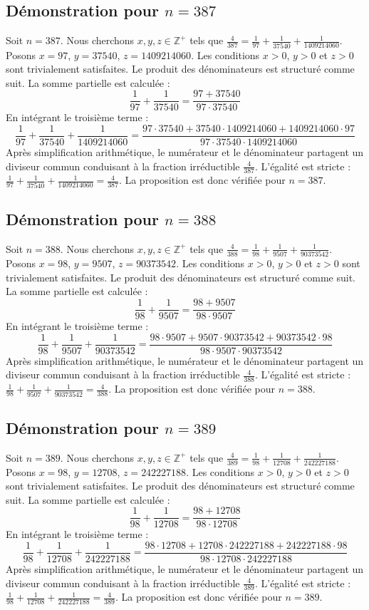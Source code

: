 \documentclass[11pt,a4paper]{article}
\begin{document}
\subsection{Démonstration pour $n = 387$}
Soit $n = 387$. Nous cherchons $x, y, z \in \mathbb{Z}^{+}$ tels que $\frac{4}{387} = \frac{1}{97} + \frac{1}{37540} + \frac{1}{1409214060}$.
Posons $x = 97$, $y = 37540$, $z = 1409214060$.
Les conditions $x > 0$, $y > 0$ et $z > 0$ sont trivialement satisfaites.
Le produit des dénominateurs est structuré comme suit. La somme partielle est calculée :
$$ \frac{1}{97} + \frac{1}{37540} = \frac{97+37540}{97 \cdot 37540} $$
En intégrant le troisième terme :
$$ \frac{1}{97} + \frac{1}{37540} + \frac{1}{1409214060} = \frac{97 \cdot 37540 + 37540 \cdot 1409214060 + 1409214060 \cdot 97}{97 \cdot 37540 \cdot 1409214060} $$
Après simplification arithmétique, le numérateur et le dénominateur partagent un diviseur commun conduisant à la fraction irréductible $\frac{4}{387}$.
L'égalité est stricte : $\frac{1}{97} + \frac{1}{37540} + \frac{1}{1409214060} = \frac{4}{387}$.
La proposition est donc vérifiée pour $n = 387$.
\subsection{Démonstration pour $n = 388$}
Soit $n = 388$. Nous cherchons $x, y, z \in \mathbb{Z}^{+}$ tels que $\frac{4}{388} = \frac{1}{98} + \frac{1}{9507} + \frac{1}{90373542}$.
Posons $x = 98$, $y = 9507$, $z = 90373542$.
Les conditions $x > 0$, $y > 0$ et $z > 0$ sont trivialement satisfaites.
Le produit des dénominateurs est structuré comme suit. La somme partielle est calculée :
$$ \frac{1}{98} + \frac{1}{9507} = \frac{98+9507}{98 \cdot 9507} $$
En intégrant le troisième terme :
$$ \frac{1}{98} + \frac{1}{9507} + \frac{1}{90373542} = \frac{98 \cdot 9507 + 9507 \cdot 90373542 + 90373542 \cdot 98}{98 \cdot 9507 \cdot 90373542} $$
Après simplification arithmétique, le numérateur et le dénominateur partagent un diviseur commun conduisant à la fraction irréductible $\frac{4}{388}$.
L'égalité est stricte : $\frac{1}{98} + \frac{1}{9507} + \frac{1}{90373542} = \frac{4}{388}$.
La proposition est donc vérifiée pour $n = 388$.
\subsection{Démonstration pour $n = 389$}
Soit $n = 389$. Nous cherchons $x, y, z \in \mathbb{Z}^{+}$ tels que $\frac{4}{389} = \frac{1}{98} + \frac{1}{12708} + \frac{1}{242227188}$.
Posons $x = 98$, $y = 12708$, $z = 242227188$.
Les conditions $x > 0$, $y > 0$ et $z > 0$ sont trivialement satisfaites.
Le produit des dénominateurs est structuré comme suit. La somme partielle est calculée :
$$ \frac{1}{98} + \frac{1}{12708} = \frac{98+12708}{98 \cdot 12708} $$
En intégrant le troisième terme :
$$ \frac{1}{98} + \frac{1}{12708} + \frac{1}{242227188} = \frac{98 \cdot 12708 + 12708 \cdot 242227188 + 242227188 \cdot 98}{98 \cdot 12708 \cdot 242227188} $$
Après simplification arithmétique, le numérateur et le dénominateur partagent un diviseur commun conduisant à la fraction irréductible $\frac{4}{389}$.
L'égalité est stricte : $\frac{1}{98} + \frac{1}{12708} + \frac{1}{242227188} = \frac{4}{389}$.
La proposition est donc vérifiée pour $n = 389$.
\end{document}
